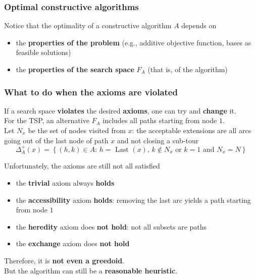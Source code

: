 \vfill

\subsubsection*{Optimal constructive algorithms}
Notice that the optimality of a constructive algorithm $A$ depends on
\begin{itemize}
	\item the \textbf{properties of the problem} (e.g., additive objective function, bases as feasible solutions)
	\item the \textbf{properties of the search space} $F_A$ (that is, of the algorithm)
\end{itemize}


\newpage

\subsubsection{What to do when the axioms are violated}
If a search space \textbf{violates} the desired \textbf{axioms}, one can try and \textbf{change} it.\\

For the TSP, an alternative $F_A$ includes all paths starting from node $1$.\\
Let $N_x$ be the set of nodes visited from $x$: the acceptable extensions are all arcs going out of the last node of path $x$ and not closing a sub-tour
$$ \Delta_A^+ (x) = \left\{(h,k) \in A : \, h = \text{ Last } (x), \, k \notin N_x \text{ or } k = 1 \text{ and } N_x = N \right\} $$

Unfortunately, the axioms are still not all satisfied
\begin{itemize}
	\item the \textbf{trivial} axiom always \textbf{holds}
	\item the \textbf{accessibility} axiom \textbf{holds}: removing the last arc yields a path starting from node $1$
	\item the \textbf{heredity} axiom does \textbf{not hold}: not all subsets are paths
	\item the \textbf{exchange} axiom does \textbf{not hold}
\end{itemize}

Therefore, it is \textbf{not even a greedoid}.\\

But the algorithm can still be a \textbf{reasonable heuristic}.\\

